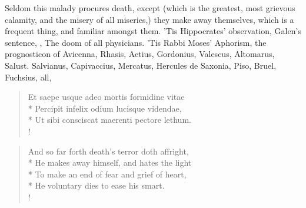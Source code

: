 Seldom this malady procures death, except (which is the
greatest, most grievous calamity, and the misery of all miseries,) they make
away themselves, which is a frequent thing, and familiar amongst them. 'Tis
Hippocrates' observation, Galen's sentence, ,
 The doom of all
physicians. 'Tis Rabbi Moses' Aphorism, the prognosticon
of Avicenna, Rhasis, Aetius, Gordonius, Valescus, Altomarus, Salust. Salvianus,
Capivaccius, Mercatus, Hercules de Saxonia, Piso, Bruel, Fuchsius, all, \etc{}

\begin{latin}
\begin{verse}%
Et saepe usque adeo mortis formidine vitae\\*
Percipit infelix odium lucisque videndae,\\*
Ut sibi consciscat maerenti pectore lethum.\\!
\end{verse}%
\end{latin}
\translationrule%
\begin{verse}%
And so far forth death's terror doth affright,\\*
He makes away himself, and hates the light\\*
To make an end of fear and grief of heart,\\*
He voluntary dies to ease his smart.\\!
\end{verse}%
%

